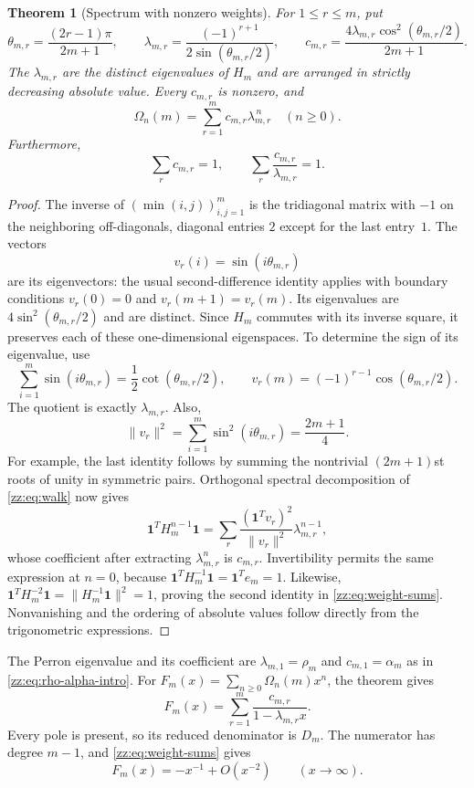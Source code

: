 \documentclass[11pt,a4paper]{article}
\newtheorem{theorem}{Theorem}[section]
\theoremstyle{definition}
\newcommand{\Om}{\Omega}
\newcommand{\one}{\mathbf{1}}
\begin{document}
\begin{theorem}[Spectrum with nonzero weights]
\label{zz:thm:spectral}
For $1\le r\le m$, put
\[
 \theta_{m,r}=\frac{(2r-1)\pi}{2m+1},\qquad
 \lambda_{m,r}=\frac{(-1)^{r+1}}{2\sin(\theta_{m,r}/2)},\qquad
 c_{m,r}=\frac{4\lambda_{m,r}\cos^2(\theta_{m,r}/2)}{2m+1}.
\]
The $\lambda_{m,r}$ are the distinct eigenvalues of $H_m$ and are arranged in
strictly decreasing absolute value.  Every $c_{m,r}$ is nonzero, and
\begin{equation}\label{zz:eq:full-spectrum}
 \Om_n(m)=\sum_{r=1}^m c_{m,r}\lambda_{m,r}^{\,n}
 \quad(n\ge0).
\end{equation}
Furthermore,
\begin{equation}\label{zz:eq:weight-sums}
 \sum_r c_{m,r}=1,\qquad \sum_r\frac{c_{m,r}}{\lambda_{m,r}}=1.
\end{equation}
\end{theorem}
\begin{proof}
The inverse of $(\min(i,j))_{i,j=1}^m$ is the tridiagonal matrix with
$-1$ on the neighboring off-diagonals, diagonal entries $2$ except for the
last entry~$1$.  The vectors
\[
 v_r(i)=\sin(i\theta_{m,r})
\]
are its eigenvectors: the usual second-difference identity applies with
boundary conditions $v_r(0)=0$ and $v_r(m+1)=v_r(m)$.
Its eigenvalues are $4\sin^2(\theta_{m,r}/2)$ and are distinct.
Since $H_m$ commutes with its inverse square, it preserves each of these
one-dimensional eigenspaces.  To determine the sign of its eigenvalue, use
\[
 \sum_{i=1}^m\sin(i\theta_{m,r})
 =\frac12\cot(\theta_{m,r}/2),\qquad
 v_r(m)=(-1)^{r-1}\cos(\theta_{m,r}/2).
\]
The quotient is exactly $\lambda_{m,r}$.
Also,
\[
 \|v_r\|^2=\sum_{i=1}^m\sin^2(i\theta_{m,r})=\frac{2m+1}{4}.
\]
For example, the last identity follows by summing the nontrivial
$(2m+1)$st roots of unity in symmetric pairs.
Orthogonal spectral decomposition of \eqref{zz:eq:walk} now gives
\[
 \one^TH_m^{n-1}\one
 =\sum_r\frac{(\one^Tv_r)^2}{\|v_r\|^2}\lambda_{m,r}^{n-1},
\]
whose coefficient after extracting $\lambda_{m,r}^n$ is $c_{m,r}$.
Invertibility permits the same expression at $n=0$, because
$\one^TH_m^{-1}\one=\one^Te_m=1$.
Likewise,
$\one^TH_m^{-2}\one=\|H_m^{-1}\one\|^2=1$, proving the second
identity in \eqref{zz:eq:weight-sums}.  Nonvanishing and the ordering of absolute
values follow directly from the trigonometric expressions.
\end{proof}

The Perron eigenvalue and its coefficient are
$\lambda_{m,1}=\rho_m$ and $c_{m,1}=\alpha_m$ as in
\eqref{zz:eq:rho-alpha-intro}.
For $F_m(x)=\sum_{n\ge0}\Om_n(m)x^n$, the theorem gives
\begin{equation}\label{zz:eq:F-spectrum}
 F_m(x)=\sum_{r=1}^m\frac{c_{m,r}}{1-\lambda_{m,r}x}.
\end{equation}
Every pole is present, so its reduced denominator is $D_m$.
The numerator has degree $m-1$, and \eqref{zz:eq:weight-sums} gives
\begin{equation}\label{zz:eq:F-infinity}
 F_m(x)=-x^{-1}+O(x^{-2})\qquad(x\to\infty).
\end{equation}
\end{document}
